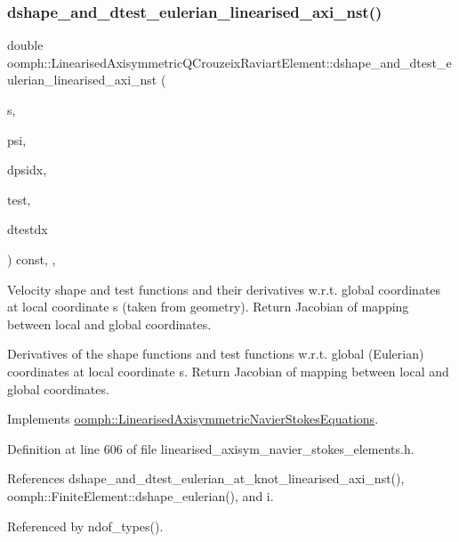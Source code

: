 \subsubsection{\texorpdfstring{dshape\+\_\+and\+\_\+dtest\+\_\+eulerian\+\_\+linearised\+\_\+axi\+\_\+nst()}{dshape\_and\_dtest\_eulerian\_linearised\_axi\_nst()}}
{\footnotesize\ttfamily double oomph\+::\+Linearised\+Axisymmetric\+Q\+Crouzeix\+Raviart\+Element\+::dshape\+\_\+and\+\_\+dtest\+\_\+eulerian\+\_\+linearised\+\_\+axi\+\_\+nst (\begin{DoxyParamCaption}\item[{const \hyperlink{classoomph_1_1Vector}{Vector}$<$ double $>$ \&}]{s,  }\item[{\hyperlink{classoomph_1_1Shape}{Shape} \&}]{psi,  }\item[{\hyperlink{classoomph_1_1DShape}{D\+Shape} \&}]{dpsidx,  }\item[{\hyperlink{classoomph_1_1Shape}{Shape} \&}]{test,  }\item[{\hyperlink{classoomph_1_1DShape}{D\+Shape} \&}]{dtestdx }\end{DoxyParamCaption}) const\hspace{0.3cm}{\ttfamily [inline]}, {\ttfamily [protected]}, {\ttfamily [virtual]}}



Velocity shape and test functions and their derivatives w.\+r.\+t. global coordinates at local coordinate s (taken from geometry). Return Jacobian of mapping between local and global coordinates. 

Derivatives of the shape functions and test functions w.\+r.\+t. global (Eulerian) coordinates at local coordinate s. Return Jacobian of mapping between local and global coordinates. 

Implements \hyperlink{classoomph_1_1LinearisedAxisymmetricNavierStokesEquations_a0c2247614d1d1414dc53cde8e755e836}{oomph\+::\+Linearised\+Axisymmetric\+Navier\+Stokes\+Equations}.



Definition at line 606 of file linearised\+\_\+axisym\+\_\+navier\+\_\+stokes\+\_\+elements.\+h.



References dshape\+\_\+and\+\_\+dtest\+\_\+eulerian\+\_\+at\+\_\+knot\+\_\+linearised\+\_\+axi\+\_\+nst(), oomph\+::\+Finite\+Element\+::dshape\+\_\+eulerian(), and i.



Referenced by ndof\+\_\+types().

\mbox{\label{classoomph_1_1LinearisedAxisymmetricQCrouzeixRaviartElement_aad815f117651a5d45360685ca30bcc98}} 
